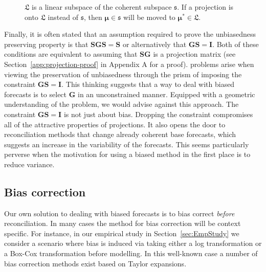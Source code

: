 \documentclass[12pt]{article}
\theoremstyle{definition}
\begin{document}
\begin{figure}[!hbt]
  \centering
  \vspace{-0.9cm}
  \small
  \resizebox{0.8\linewidth}{!}{
    
  }
  \caption{$\mathfrak{L}$ is a linear subspace of the coherent subspace $\mathfrak{s}$. If a projection is onto $\mathfrak{L}$ instead of $\mathfrak{s}$, then $\bm{\mu} \in \mathfrak{s}$ will be moved to $\bm{\mu}^* \in \mathfrak{L}$.}\label{fig:Schematic_3D}
\end{figure}

Finally, it is often stated that an assumption required to prove the unbiasedness preserving property is that $\bm{S}\bm{G}\bm{S}=\bm{S}$ or alternatively that $\bm{G}\bm{S}=\bm{I}$. Both of these conditions are equivalent to assuming that $\bm{S}\bm{G}$ is a projection matrix (see Section~\ref{app:projection-proof} in Appendix A for a proof). {\color{blue}{Despite this connection,}} problems arise when viewing the preservation of unbiasedness through the prism of imposing the constraint $\bm{G}\bm{S}=\bm{I}$. This thinking suggests that a way to deal with biased forecasts is to select $\bm{G}$ in an unconstrained manner. Equipped with a geometric understanding of the problem, we would advise against this approach. The constraint $\bm{G}\bm{S}=\bm{I}$ is not just about bias. Dropping the constraint compromises all of the attractive properties of projections. It also opens the door to reconciliation methods that change already coherent base forecasts, which suggests an increase in the variability of the forecasts. This seems particularly perverse when the motivation for using a biased method in the first place is to reduce variance.

\subsection{Bias correction}

Our own solution to dealing with biased forecasts is to bias correct \emph{before} reconciliation. In many cases the method for bias correction will be context specific. For instance, in our empirical study in Section~\ref{sec:EmpStudy} we consider a scenario where bias is induced via taking either a log transformation or a Box-Cox transformation before modelling. In this well-known case a number of bias correction methods exist based on Taylor expansions.
\end{document}

